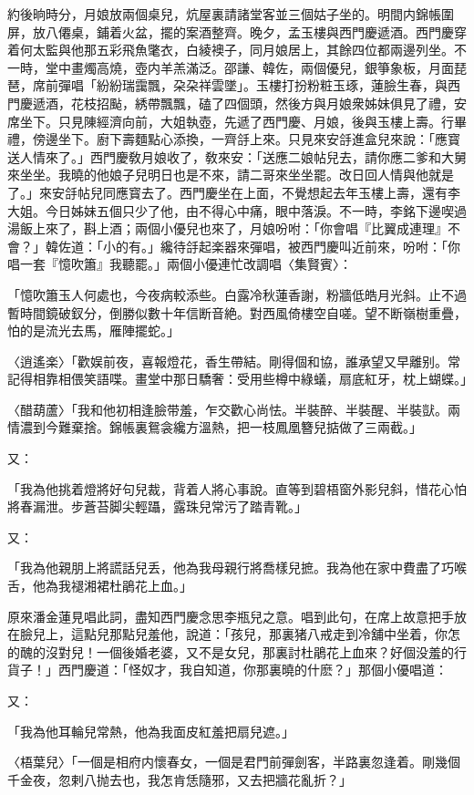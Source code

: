 約後晌時分，月娘放兩個桌兒，炕屋裏請諸堂客並三個姑子坐的。明間内錦帳圍屏，放八僊桌，鋪着火盆，擺的案酒整齊。晚夕，孟玉樓與西門慶遞酒。西門慶穿着何太監與他那五彩飛魚氅衣，白綾襖子，同月娘居上，其餘四位都兩邊列坐。不一時，堂中畫燭高燒，壺内羊羔滿泛。邵謙、韓佐，兩個優兒，銀箏象板，月面琵琶，席前彈唱「紛紛瑞靄飄，朶朶祥雲墜」。玉樓打扮粉粧玉琢，蓮臉生春，與西門慶遞酒，花枝招颭，綉帶飄飄，磕了四個頭，然後方與月娘衆姊妹俱見了禮，安席坐下。只見陳經濟向前，大姐執壺，先遞了西門慶、月娘，後與玉樓上壽。行畢禮，傍邊坐下。廚下壽麵點心添換，一齊㧱上來。只見來安㧱進盒兒來說：「應寳送人情來了。」西門慶敎月娘收了，敎來安：「送應二娘帖兒去，請你應二爹和大舅來坐坐。我曉的他娘子兒明日也是不來，請二哥來坐坐罷。改日回人情與他就是了。」來安㧱帖兒同應寳去了。西門慶坐在上面，不覺想起去年玉樓上壽，還有李大姐。今日姊妹五個只少了他，由不得心中痛，眼中落淚。不一時，李銘下邊喫過湯飯上來了，斟上酒；兩個小優兒也來了，月娘吩咐：「你會唱『比翼成連理』不會？」韓佐道：「小的有。」纔待㧱起楽器來彈唱，被西門慶叫近前來，吩咐：「你唱一套『憶吹簫』我聽罷。」兩個小優連忙改調唱〈集賢賓〉：

「憶吹簫玉人何處也，今夜病較添些。白露冷秋蓮香謝，粉牆低皓月光斜。止不過暫時間鏡破釵分，倒勝似數十年信断音絶。對西風倚樓空自嗟。望不断嶺樹重疊，怕的是流光去馬，雁陣擺蛇。」

〈逍遙楽〉「歡娱前夜，喜報燈花，香生帶結。剛得個和協，誰承望又早離别。常記得相靠相偎笑語喋。畫堂中那日驕奢：受用些樽中綠蟻，扇底紅牙，枕上蝴蝶。」

〈醋葫蘆〉「我和他初相逢臉带羞，乍交歡心尚怯。半裝醉、半裝醒、半裝獃。兩情濃到今難棄捨。錦帳裏鴛衾纔方溫熱，把一枝鳳凰簪兒掂做了三兩截。」

又：

「我為他挑着燈將好句兒裁，背着人將心事說。直等到碧梧窗外影兒斜，惜花心怕將春漏泄。步蒼苔脚尖輕躡，露珠兒常污了踏青靴。」

又：

「我為他親朋上將謊話兒丢，他為我母親行將喬樣兒摭。我為他在家中費盡了巧喉舌，他為我褪湘裙杜鵑花上血。」

原來潘金蓮見唱此詞，盡知西門慶念思李瓶兒之意。唱到此句，在席上故意把手放在臉兒上，這點兒那點兒羞他，說道：「孩兒，那裏猪八戒走到冷舖中坐着，你怎的醜的沒對兒！一個後婚老婆，又不是女兒，那裏討杜鵑花上血來？好個没羞的行貨子！」西門慶道：「怪奴才，我自知道，你那裏曉的什麽？」那個小優唱道：

又：

「我為他耳輪兒常熱，他為我面皮紅羞把扇兒遮。」

〈梧葉兒〉「一個是相府内懷春女，一個是君門前彈劍客，半路裏忽逢着。剛幾個千金夜，忽剌八抛去也，我怎肯恁隨邪，又去把牆花亂折？」

